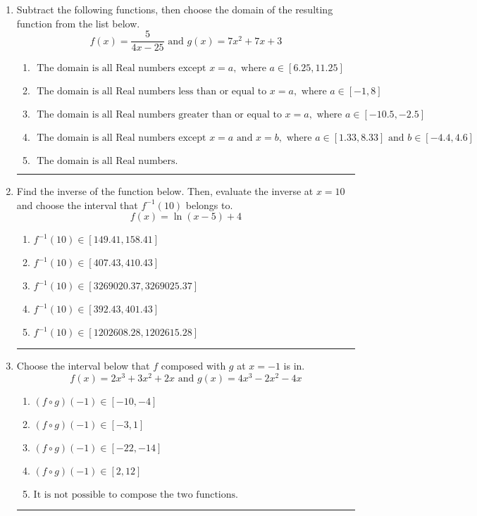 \documentclass[14pt]{extbook}
\newcommand{\litem}[1]{\item#1\hspace*{-1cm}\rule{\textwidth}{0.4pt}}
\begin{document}
\begin{enumerate}
{\begin{enumerate}[label=\Alph*.]
\end{enumerate} }
\litem{
Subtract the following functions, then choose the domain of the resulting function from the list below.\[ f(x) = \frac{5}{4x-25} \text{ and } g(x) = 7x^{2} +7 x + 3 \]\begin{enumerate}[label=\Alph*.]
\item \( \text{ The domain is all Real numbers except } x = a, \text{ where } a \in [6.25, 11.25] \)
\item \( \text{ The domain is all Real numbers less than or equal to } x = a, \text{ where } a \in [-1, 8] \)
\item \( \text{ The domain is all Real numbers greater than or equal to } x = a, \text{ where } a \in [-10.5, -2.5] \)
\item \( \text{ The domain is all Real numbers except } x = a \text{ and } x = b, \text{ where } a \in [1.33, 8.33] \text{ and } b \in [-4.4, 4.6] \)
\item \( \text{ The domain is all Real numbers. } \)

\end{enumerate} }
\litem{
Find the inverse of the function below. Then, evaluate the inverse at $x = 10$ and choose the interval that $f^{-1}(10)$ belongs to.\[ f(x) = \ln{(x-5)}+4 \]\begin{enumerate}[label=\Alph*.]
\item \( f^{-1}(10) \in [149.41, 158.41] \)
\item \( f^{-1}(10) \in [407.43, 410.43] \)
\item \( f^{-1}(10) \in [3269020.37, 3269025.37] \)
\item \( f^{-1}(10) \in [392.43, 401.43] \)
\item \( f^{-1}(10) \in [1202608.28, 1202615.28] \)

\end{enumerate} }
\litem{
Choose the interval below that $f$ composed with $g$ at $x=-1$ is in.\[ f(x) = 2x^{3} +3 x^{2} +2 x \text{ and } g(x) = 4x^{3} -2 x^{2} -4 x \]\begin{enumerate}[label=\Alph*.]
\item \( (f \circ g)(-1) \in [-10, -4] \)
\item \( (f \circ g)(-1) \in [-3, 1] \)
\item \( (f \circ g)(-1) \in [-22, -14] \)
\item \( (f \circ g)(-1) \in [2, 12] \)
\item \( \text{It is not possible to compose the two functions.} \)


\end{enumerate}}
\end{enumerate}
\end{document}
